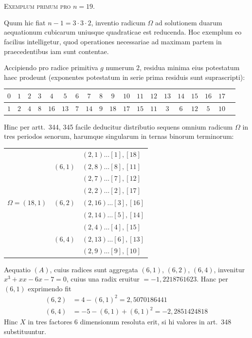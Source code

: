 \documentclass[12pt,a4paper]{article}
\theoremstyle{plain}
\theoremstyle{definition}
\theoremstyle{remark}
\begin{document}
\section{}

\textsc{Exemplum primum pro $n=19$.}

Quum hic fiat $n-1=3\cdot 3\cdot 2$, inventio radicum $\Omega$ ad solutionem duarum aequationum cubicarum uniusque quadraticae est reducenda. Hoc exemplum eo facilius intelligetur, quod operationes necessariae ad maximam partem in praecedentibus iam sunt contentae.

Accipiendo pro radice primitiva $g$ numerum $2$, residua minima eius potestatum haec prodeunt (exponentes potestatum in serie prima residuis sunt suprascripti):
\begin{center}
\begin{tabular}{c|cccccccccccccccccc}
$0$ & $1$ & $2$ & $3$ & $4$ & $5$ & $6$ & $7$ & $8$ & $9$ & $10$ & $11$ & $12$ & $13$ & $14$ & $15$ & $16$ & $17$\\
\hline
$1$ & $2$ & $4$ & $8$ & $16$ & $13$ & $7$ & $14$ & $9$ & $18$ & $17$ & $15$ & $11$ & $3$ & $6$ & $12$ & $5$ & $10$
\end{tabular}
\end{center}
Hinc per artt.\ 344, 345 facile deducitur distributio sequens omnium radicum $\Omega$ in tres periodos senorum, harumque singularum in ternas binorum terminorum:
\begin{center}
\begin{tabular}{lcl}
& & $(2,1)\ldots[1],[18]$\\
& $(6,1)$ & $(2,8)\ldots[8],[11]$\\
& & $(2,7)\ldots[7],[12]$\\
& & $(2,2)\ldots[2],[17]$\\
$\Omega=(18,1)$ & $(6,2)$ & $(2,16)\ldots[3],[16]$\\
& & $(2,14)\ldots[5],[14]$\\
& & $(2,4)\ldots[4],[15]$\\
& $(6,4)$ & $(2,13)\ldots[6],[13]$\\
& & $(2,9)\ldots[9],[10]$
\end{tabular}
\end{center}

Aequatio $(A)$, cuius radices sunt aggregata $(6,1)$, $(6,2)$, $(6,4)$, invenitur $x^3+xx-6x-7=0$, cuius una radix eruitur $=-1{,}2218761623$. Hanc per $(6,1)$ exprimendo fit
\begin{align*}
(6,2)&=4-(6,1)^2=2{,}5070186441\\
(6,4)&=-5-(6,1)+(6,1)^2=-2{,}2851424818
\end{align*}
Hinc $X$ in tres factores $6$ dimensionum resoluta erit, si hi valores in art.\ 348 substituuntur.
\end{document}
